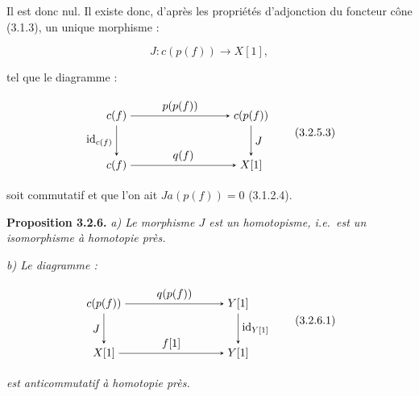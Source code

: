 \clearpage
{}%
Il est donc nul. Il existe donc, d'après les propriétés d'adjonction du
foncteur cône (3.1.3), un unique morphisme :

\begin{equation}
  J\colon c(p(f))\longrightarrow X[1],
  \tag{3.2.5.2}
\end{equation}

\noindent tel que le diagramme :

\begin{equation}
  \begin{tikzpicture}[>=stealth,baseline=(current bounding box.center)]
    \node (Cf1) at (0,1.55) {$c(f)$};
    \node (Cpf) at (4.2,1.55) {$c(p(f))$};
    \node (Cf2) at (0,0) {$c(f)$};
    \node (Xs)  at (4.2,0) {$X[1]$};
    \draw[->] (Cf1) -- node[above] {$p(p(f))$} (Cpf);
    \draw[->] (Cf1) -- node[left] {$\operatorname{id}_{c(f)}$} (Cf2);
    \draw[->] (Cpf) -- node[right] {$J$} (Xs);
    \draw[->] (Cf2) -- node[above] {$q(f)$} (Xs);
  \end{tikzpicture}
  \tag{3.2.5.3}
\end{equation}

\noindent soit commutatif et que l'on ait
$Ja(p(f))=0$ (3.1.2.4).

\noindent\textbf{Proposition 3.2.6.}\quad
{}
\emph{a) Le morphisme $J$ est un homotopisme, i.e.\ est un isomorphisme à
homotopie près.}

\emph{b) Le diagramme :}

\begin{equation}
  \begin{tikzpicture}[>=stealth,baseline=(current bounding box.center)]
    \node (Cpf) at (0,1.55) {$c(p(f))$};
    \node (Ys1) at (4.2,1.55) {$Y[1]$};
    \node (Xs)  at (0,0) {$X[1]$};
    \node (Ys2) at (4.2,0) {$Y[1]$};
    \draw[->] (Cpf) -- node[above] {$q(p(f))$} (Ys1);
    \draw[->] (Cpf) -- node[left] {$J$} (Xs);
    \draw[->] (Ys1) -- node[right] {$\operatorname{id}_{Y[1]}$} (Ys2);
    \draw[->] (Xs) -- node[above] {$f[1]$} (Ys2);
  \end{tikzpicture}
  \tag{3.2.6.1}
\end{equation}

\noindent\emph{est anticommutatif à homotopie près.}

